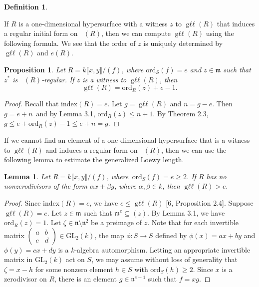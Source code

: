 \documentclass{amsart}
\newtheorem{proposition}[theorem]{Proposition}
\newtheorem{lemma}[theorem]{Lemma}
\theoremstyle{definition}
\theoremstyle{definition}
\newtheorem{definition}[theorem]{Definition}
\DeclareMathOperator{\gr}{\text{gr}_{\mathfrak{m}}}
\DeclareMathOperator{\gll}{\text{g}\ell\ell}
\numberwithin{equation}{section}
\theoremstyle{definition}
\begin{document}
{\begin{definition}
\end{definition}
If $R$ is a one-dimensional hypersurface with a witness $z$ to $\gll(R)$ that induces a regular initial form on $\gr(R)$, then we can compute $\gll(R)$ using the following formula. We see that the order of $z$ is uniquely determined by $\gll(R)$ and $e(R)$.
\begin{proposition}
 Let $R=k \llbracket x,y \rrbracket/(f)$, where $\text{ord}_{S}(f)=e$ and $z \in \mathfrak{m}$ such that $z^{*}$ is $\gr(R)$-regular. If $z$ is a witness to $\gll(R)$, then  \[\gll(R)=\text{ord}_{R} (z)+e-1.\]
\end{proposition}
\begin{proof} Recall that $\text{index}(R)=e$. Let $g=\gll(R)$ and $n=g-e$. Then \,$g=e+n$\, and by Lemma 3.1, $\text{ord}_{R}(z) \leq n+1$. By Theorem 2.3,\, $g \leq e+\text{ord}_{R}(z)-1 \leq e+n=g$.
\end{proof}\text{}\newline 
If we cannot find an element of a one-dimensional hypersurface that is a witness to $\gll(R)$ and induces a regular form on $\gr(R)$, then we can use the following lemma to estimate the generalized Loewy length. \newline  
\begin{lemma} Let $R=k \llbracket x,y \rrbracket/(f)$, where \,$\text{ord}_{S}(f)=e \geq 2$. If $R$ has no nonzerodivisors of the form $\alpha x+\beta y$, where $\alpha,\beta \in k$, then $\gll(R)>e.$\text{}\end{lemma}\begin{proof} Since $\text{index}(R)=e$, we have $e \leq \gll(R)$ [6, Proposition 2.4]. Suppose $\gll(R)=e$. Let $z \in \mathfrak{m}$ such that $\mathfrak{m}^{e} \subseteq (z)$. By Lemma 3.1, we have $\text{ord}_{R}(z)=1$. Let $\zeta \in \mathfrak{n} \setminus \mathfrak{n}^2$ be a preimage of $z$. Note that for each invertible matrix $\begin{pmatrix}
a & b \\
c & d 
\end{pmatrix} \in \text{GL}_2(k)$, the map $\phi:S \longrightarrow S$ defined by $\phi(x)=ax+by$ and $\phi(y)=cx+dy$ is a $k$-algebra automorphism. Letting an appropriate invertible matrix in $\text{GL}_{2}(k)$ act on $S$, we may assume without loss of generality that $\zeta=x-h$ for some nonzero element $h \in S$ with $\text{ord}_{S}(h) \geq 2$. Since $x$ is a zerodivisor on $R$, there is an element $g \in \mathfrak{n}^{e-1}$ such that $f=xg$. \newline\newline

\end{proof}}
\end{document}
